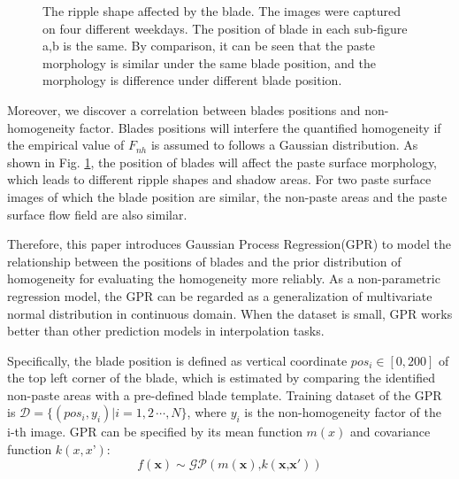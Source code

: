\documentclass[pdflatex,sn-mathphys]{sn-jnl}%
\theoremstyle{thmstyleone}%
\theoremstyle{thmstyletwo}%
\theoremstyle{thmstylethree}%
\begin{document}
\begin{figure}[htb]
    \centering
    \hfill
    \caption{The ripple shape affected by the blade. The images were captured on four different weekdays. The position of blade in each sub-figure a,b is the same. By comparison, it can be seen that the paste morphology is similar under the same blade position, and the morphology is difference under different blade position.}
    \label{ripple comparison}
\end{figure}

Moreover, we discover a correlation between blades positions and non-homogeneity factor. Blades positions will interfere the quantified homogeneity if the empirical value of $F_{nh}$ is assumed to follows a Gaussian distribution. As shown in Fig. \ref{ripple comparison}, the position of blades will affect the paste surface morphology, which leads to different ripple shapes and shadow areas.
For two paste surface images of which the blade position are similar, the non-paste areas and the paste surface flow field are also similar.         


Therefore, this paper introduces Gaussian Process Regression(GPR) to model the relationship between the positions of blades and the prior distribution of homogeneity for evaluating the homogeneity more reliably. 
As a non-parametric regression model, the GPR can be regarded as a generalization of multivariate normal distribution in continuous domain.
When the dataset is small, GPR works better than other prediction models in interpolation tasks\cite{KONG2018556}.

Specifically, the blade position is defined as vertical coordinate $pos_i \in\left[0,200 \right]$ of the top left corner of the blade, which is estimated by comparing the identified non-paste areas with a pre-defined blade template. Training dataset of the GPR is $\mathcal D=\{(pos_i, y_i)\vert i=1,2\,\cdots,N\}$, where $y_i$ is the non-homogeneity factor of the i-th image. GPR can be specified by its mean function $m(x)$ and covariance function $k(x, x’)$:
\begin{equation}
f(\boldsymbol x)\sim\mathcal{GP}(m(\boldsymbol x)\text{,}k(\boldsymbol x\text{,}\boldsymbol x'))
\end{equation}
\end{document}
